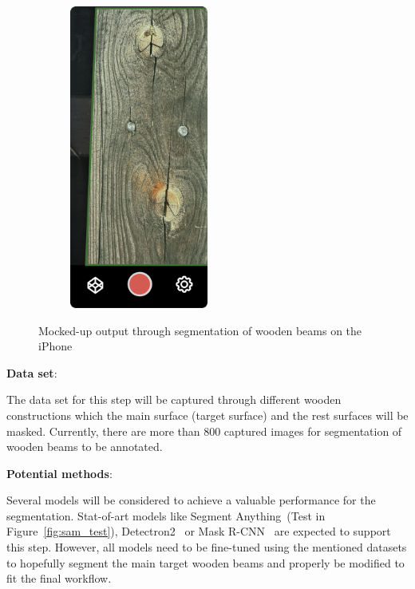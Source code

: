 \begin{figure}[ht]
\begin{subfigure}[b]{0.4\textwidth}
        \includegraphics[width=0.5\textwidth]{Master Thesis/Images/Section_3/Mock/3-Mock2.png}
    \end{subfigure}
  \caption{Mocked-up output through segmentation of wooden beams on the iPhone}   
\label{fig:mock1}
\end{figure}  

\textbf{Data set}:

The data set for this step will be captured through different wooden constructions which the main surface (target surface) and the rest surfaces will be masked. Currently, there are more than 800 captured images for segmentation of wooden beams to be annotated.

\hspace*{\fill}

\newpage
\textbf{Potential methods}:

Several models will be considered to achieve a valuable performance for the segmentation. Stat-of-art models like Segment Anything~\citep{kirillov2023segany}(Test in Figure~\ref{fig:sam_test}), Detectron2~\citep{wu2019detectron2} or Mask R-CNN~\citep{matterport_maskrcnn_2017} are expected to support this step. However, all models need to be fine-tuned using the mentioned datasets to hopefully segment the main target wooden beams and properly be modified to fit the final workflow.

